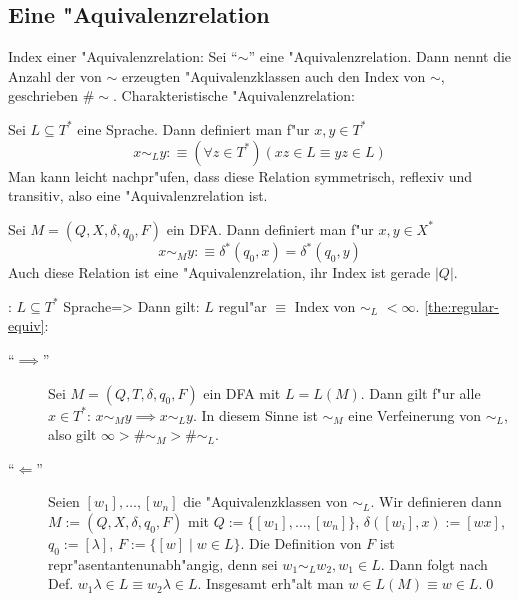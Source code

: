 \subsection{Eine "Aquivalenzrelation}
\label{sub:regular-equivrel}
 Index einer "Aquivalenzrelation:{
  Sei ``$\sim$'' eine "Aquivalenzrelation. Dann nennt die
  Anzahl der von $\sim$ erzeugten "Aquivalenzklassen auch den 
  Index von $\sim$, geschrieben $\#\sim$.
  }
 Charakteristische "Aquivalenzrelation:{
  Sei $L\subseteq T^*$ eine Sprache. Dann definiert man f"ur $x,y\in T^*$
  \[x\sim_L y:\equiv (\forall z\in T^*)(xz\in L\equiv yz\in L)
    \]
  Man kann leicht nachpr"ufen, dass diese Relation symmetrisch,
  reflexiv und transitiv, also eine "Aquivalenzrelation ist.
  
  Sei $M=(Q,X,\delta,q_0,F)$ ein DFA. Dann definiert man f"ur $x,y\in X^*$
  \[x\sim_M y:\equiv \delta^*(q_0,x)=\delta^*(q_0,y)
    \]
  Auch diese Relation ist eine "Aquivalenzrelation, ihr Index ist gerade
  $|Q|$.
  }
\theorem: $L\subseteq T^*$ Sprache=>{
  \label{the:regular-equiv}
  Dann gilt: $L$ regul"ar $\equiv$ Index von $\sim_L$ $<\infty$.
  }
\proof \ref{the:regular-equiv}:{
  \begin{description}
    \item[``$\implies$''] Sei $M=(Q,T,\delta,q_0,F)$ ein DFA
      mit $L = L(M)$. Dann gilt f"ur alle $x\in T^*$:
      $x\sim_M y\implies x\sim_L y$. In diesem Sinne ist
      $\sim_M$ eine Verfeinerung von $\sim_L$, also gilt      
      $\infty>\#\sim_M>\#\sim_L$.
    \item[``$\Leftarrow$''] Seien $[w_1], \dots, [w_n]$ die
      "Aquivalenzklassen von $\sim_L$. Wir definieren dann $M:=(Q,X,\delta,q_0,F)$ 
      mit $Q:=\{[w_1],\ldots,[w_n]\}$, $\delta([w_i],x):=[wx]$, $q_0:=[\lambda]$,
      $F:=\{[w]\mid w\in L\}$. Die Definition von $F$ ist 
      repr"asentantenunabh"angig, denn sei $w_1\sim_L w_2,w_1\in L$. Dann
      folgt nach Def. $w_1\lambda\in L\equiv w_2\lambda\in L$.
      Insgesamt erh"alt man $w\in L(M)\equiv w\in L$.\qed
    \end{description}
  }
